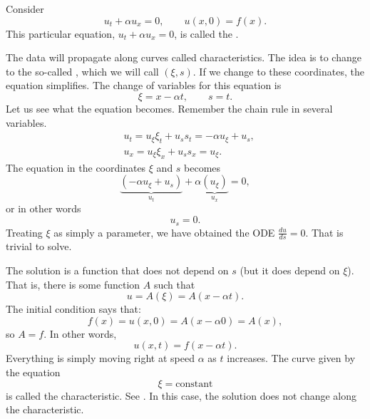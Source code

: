 \begin{example}
Consider
\begin{equation*}
u_t + \alpha u_x = 0, \qquad u(x,0) = f(x) .
\end{equation*}
This particular equation, $u_t + \alpha u_x = 0$, is
called the \emph{}.

The data will propagate along curves called characteristics.  The
idea is to change to the
so-called \emph{}, which we will call
$(\xi,s)$.
If we change to these coordinates, the equation simplifies.  The change of variables for this
equation is
\begin{equation*}
\xi = x - \alpha t ,  \qquad s = t .
\end{equation*}
Let us see what the equation becomes. Remember the chain rule in several
variables.
\begin{align*}
& u_t = u_\xi \xi_t + u_s s_t = - \alpha u_\xi + u_s , \\
& u_x = u_\xi \xi_x + u_s s_x = u_\xi .
\end{align*}
The equation in the coordinates $\xi$ and $s$ becomes
\begin{equation*}
\underbrace{(- \alpha u_\xi + u_s)}_{u_t} + \alpha
\underbrace{(u_\xi)}_{u_x} = 0 ,
\end{equation*}
or in other words
\begin{equation*}
u_s = 0 .
\end{equation*}
Treating $\xi$ as simply a parameter, we have
obtained the ODE $\frac{d u}{d s} = 0$.
That is trivial to solve.

The solution is a function that does
not depend on $s$ (but it does depend on $\xi$).
That is, there is some function $A$ such that
\begin{equation*}
u = A(\xi) = A(x - \alpha t) .
\end{equation*}
The initial condition says that:
\begin{equation*}
f(x) = u(x,0) = A(x - \alpha 0) = A(x) ,
\end{equation*}
so $A=f$.  In other words,
\begin{equation*}
u(x,t) = f(x-\alpha t) .
\end{equation*}
Everything is simply moving right at speed $\alpha$ as $t$ increases.
The curve given by the equation
\begin{equation*}
\xi = \text{constant}
\end{equation*}
is called the characteristic.
See .
In this case, the solution does not change
along the characteristic.


\end{example}
